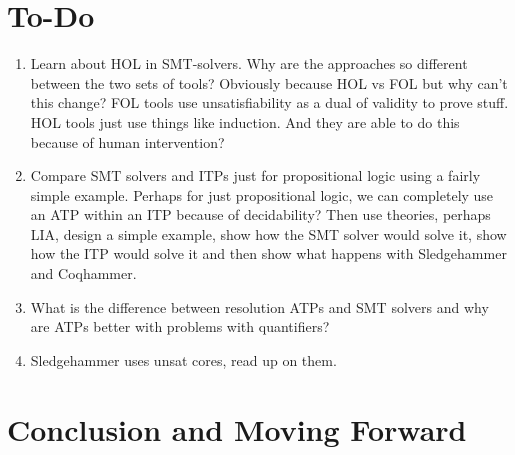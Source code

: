 \documentclass{article}
\begin{document}
\section{To-Do}
	\begin{enumerate}
		\item Learn about HOL in SMT-solvers. Why are the approaches 
		so different between the two sets of tools? Obviously because
		HOL vs FOL but why can't this change? FOL tools use unsatisfiability 
		as a dual of validity to prove stuff. HOL tools just use 
		things like induction. And they are able to do this because
		of human intervention?
		\item Compare SMT solvers and ITPs just for propositional 
		logic using a fairly simple example. Perhaps for just propositional 
		logic, we can completely use an ATP within an ITP because 
		of decidability? Then use theories, perhaps LIA, design a simple
		example, show how the SMT solver would solve it, show how the 
		ITP would solve it and then show what happens with 
		Sledgehammer and Coqhammer.
		\item What is the difference between resolution ATPs and SMT 
		solvers and why are ATPs better with problems with quantifiers?
		\item Sledgehammer uses unsat cores, read up on them.
	\end{enumerate}
	
	
\section{Conclusion and Moving Forward}
\label{sec:conc}



\end{document}
